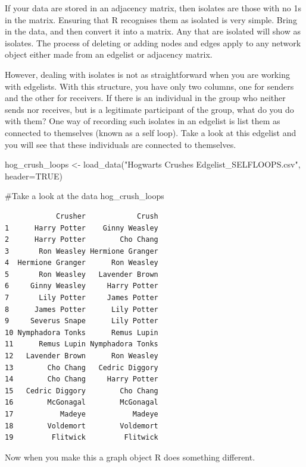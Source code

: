 \documentclass[
  letterpaper,
  DIV=11,
  numbers=noendperiod]{scrreprt}
\newenvironment{Shaded}{\begin{snugshade}}{\end{snugshade}}
\newcommand{\AttributeTok}[1]{\textcolor[rgb]{0.40,0.45,0.13}{#1}}
\newcommand{\CommentTok}[1]{\textcolor[rgb]{0.37,0.37,0.37}{#1}}
\newcommand{\ConstantTok}[1]{\textcolor[rgb]{0.56,0.35,0.01}{#1}}
\newcommand{\FunctionTok}[1]{\textcolor[rgb]{0.28,0.35,0.67}{#1}}
\newcommand{\NormalTok}[1]{\textcolor[rgb]{0.00,0.23,0.31}{#1}}
\newcommand{\OtherTok}[1]{\textcolor[rgb]{0.00,0.23,0.31}{#1}}
\newcommand{\StringTok}[1]{\textcolor[rgb]{0.13,0.47,0.30}{#1}}
\begin{document}
If your data are stored in an adjacency matrix, then isolates are those
with no 1s in the matrix. Ensuring that R recognises them as isolated is
very simple. Bring in the data, and then convert it into a matrix. Any
that are isolated will show as isolates. The process of deleting or
adding nodes and edges apply to any network object either made from an
edgelist or adjacency matrix.

However, dealing with isolates is not as straightforward when you are
working with edgelists. With this structure, you have only two columns,
one for senders and the other for receivers. If there is an individual
in the group who neither sends nor receives, but is a legitimate
participant of the group, what do you do with them? One way of recording
such isolates in an edgelist is list them as connected to themselves
(known as a self loop). Take a look at this edgelist and you will see
that these individuals are connected to themselves.

\begin{Shaded}
\begin{Highlighting}[]
\NormalTok{hog\_crush\_loops }\OtherTok{\textless{}{-}} \FunctionTok{load\_data}\NormalTok{(}\StringTok{"Hogwarts Crushes Edgelist\_SELFLOOPS.csv"}\NormalTok{, }\AttributeTok{header=}\ConstantTok{TRUE}\NormalTok{)}

\CommentTok{\#Take a look at the data}
\NormalTok{hog\_crush\_loops}
\end{Highlighting}
\end{Shaded}

\begin{verbatim}
            Crusher            Crush
1      Harry Potter    Ginny Weasley
2      Harry Potter        Cho Chang
3       Ron Weasley Hermione Granger
4  Hermione Granger      Ron Weasley
5       Ron Weasley   Lavender Brown
6     Ginny Weasley     Harry Potter
7       Lily Potter     James Potter
8      James Potter      Lily Potter
9     Severus Snape      Lily Potter
10 Nymphadora Tonks      Remus Lupin
11      Remus Lupin Nymphadora Tonks
12   Lavender Brown      Ron Weasley
13        Cho Chang   Cedric Diggory
14        Cho Chang     Harry Potter
15   Cedric Diggory        Cho Chang
16        McGonagal        McGonagal
17           Madeye           Madeye
18        Voldemort        Voldemort
19         Flitwick         Flitwick
\end{verbatim}

Now when you make this a graph object R does something different.
\end{document}

